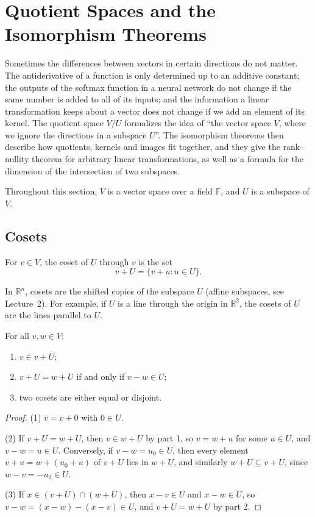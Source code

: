 \section{Quotient Spaces and the Isomorphism Theorems}\label{L1-sec:quotient}

Sometimes the differences between vectors in certain directions do not matter. The antiderivative of a function is only determined up to an additive constant; the outputs of the softmax function in a neural network do not change if the same number is added to all of its inputs; and the information a linear transformation keeps about a vector does not change if we add an element of its kernel. The quotient space $V/U$ formalizes the idea of ``the vector space $V$, where we ignore the directions in a subspace $U$''. The isomorphism theorems then describe how quotients, kernels and images fit together, and they give the rank--nullity theorem for arbitrary linear transformations, as well as a formula for the dimension of the intersection of two subspaces.

Throughout this section, $V$ is a vector space over a field $\mathbb{F}$, and $U$ is a subspace of $V$.

\subsection{Cosets}

\begin{definition}[Coset]
    For $v \in V$, the coset of $U$ through $v$ is the set
    \[v + U = \{v + u : u \in U\}.\]
\end{definition}

In $\mathbb{R}^n$, cosets are the shifted copies of the subspace $U$ (affine subspaces, see Lecture~2). For example, if $U$ is a line through the origin in $\mathbb{R}^2$, the cosets of $U$ are the lines parallel to $U$.

\begin{lemma}\label{L1-lem:cosets}
    For all $v, w \in V$:
    \begin{enumerate}
        \item $v \in v + U$;
        \item $v + U = w + U$ if and only if $v - w \in U$;
        \item two cosets are either equal or disjoint.
    \end{enumerate}
\end{lemma}

\begin{proof}
    (1) $v = v + 0$ with $0 \in U$.

    (2) If $v + U = w + U$, then $v \in w + U$ by part 1, so $v = w + u$ for some $u \in U$, and $v - w = u \in U$. Conversely, if $v - w = u_0 \in U$, then every element $v + u = w + (u_0 + u)$ of $v + U$ lies in $w + U$, and similarly $w + U \subseteq v + U$, since $w - v = -u_0 \in U$.

    (3) If $x \in (v + U) \cap (w + U)$, then $x - v \in U$ and $x - w \in U$, so $v - w = (x - w) - (x - v) \in U$, and $v + U = w + U$ by part 2.
\end{proof}

